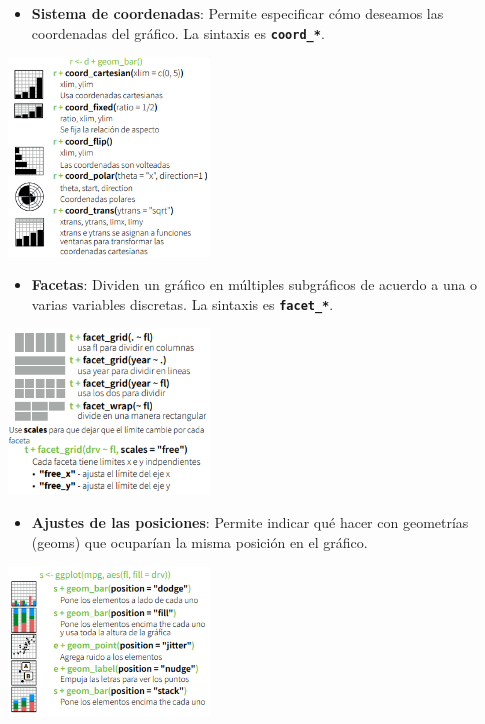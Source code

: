 \documentclass[
  letterpaper,
  DIV=11,
  numbers=noendperiod]{scrreprt}
\providecommand{\tightlist}{%
  \setlength{\itemsep}{0pt}\setlength{\parskip}{0pt}}\usepackage{longtable,booktabs,array}
\begin{document}
\begin{itemize}
\tightlist
\item
  \textbf{Sistema de coordenadas}: Permite especificar cómo deseamos las
  coordenadas del gráfico. La sintaxis es \textbf{\texttt{coord\_*}}.
\end{itemize}

\begin{center}
\includegraphics[width=0.4\textwidth,height=0.5\textheight]{Figuras/coordenadas.png}
\end{center}

\begin{itemize}
\tightlist
\item
  \textbf{Facetas}: Dividen un gráfico en múltiples subgráficos de
  acuerdo a una o varias variables discretas. La sintaxis es
  \textbf{\texttt{facet\_*}}.
\end{itemize}

\begin{center}
\includegraphics[width=0.4\textwidth,height=0.5\textheight]{Figuras/facetas.png}
\end{center}

\begin{itemize}
\tightlist
\item
  \textbf{Ajustes de las posiciones}: Permite indicar qué hacer con
  geometrías (geoms) que ocuparían la misma posición en el gráfico.
\end{itemize}

\begin{center}
\includegraphics[width=0.4\textwidth,height=0.5\textheight]{Figuras/posicion.png}
\end{center}
\end{document}
